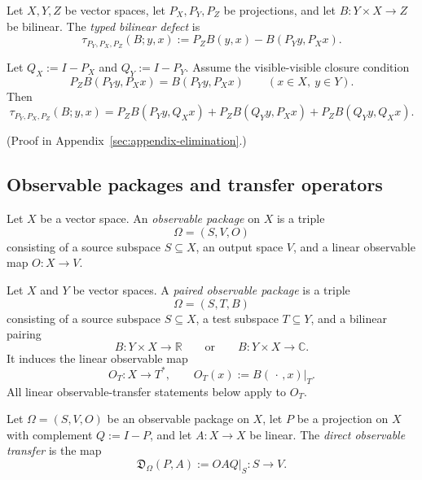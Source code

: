 \begin{definition}
\label{def:typed-bilinear-defect}
Let \(X,Y,Z\) be vector spaces, let \(P_X,P_Y,P_Z\) be projections, and let
\(B:Y\times X\to Z\) be bilinear. The \emph{typed bilinear defect} is
\[
\tau_{P_Y,P_X,P_Z}(B;y,x):=
P_ZB(y,x)-B(P_Yy,P_Xx).
\]
\end{definition}

\begin{proposition}
\label{prop:typed-bilinear-defect-decomposition}
Let \(Q_X:=I-P_X\) and \(Q_Y:=I-P_Y\). Assume the visible-visible closure
condition
\[
P_ZB(P_Yy,P_Xx)=B(P_Yy,P_Xx)
\qquad (x\in X,\ y\in Y).
\]
Then
\[
\tau_{P_Y,P_X,P_Z}(B;y,x)
=
P_ZB(P_Yy,Q_Xx)
+
P_ZB(Q_Yy,P_Xx)
+
P_ZB(Q_Yy,Q_Xx).
\]
\end{proposition}

(Proof in Appendix~\ref{sec:appendix-elimination}.)

\subsection{Observable packages and transfer operators}

\begin{definition}
\label{def:observable-package}
Let \(X\) be a vector space. An \emph{observable package} on \(X\) is a triple
\[
\Omega=(S,V,O)
\]
consisting of a source subspace \(S\subseteq X\), an output space \(V\), and a
linear observable map \(O:X\to V\).
\end{definition}

\begin{definition}
\label{def:paired-observable-package}
Let \(X\) and \(Y\) be vector spaces. A \emph{paired observable package} is a
triple
\[
\Omega=(S,T,B)
\]
consisting of a source subspace \(S\subseteq X\), a test subspace
\(T\subseteq Y\), and a bilinear pairing
\[
B:Y\times X\to \mathbb{R}
\qquad\text{or}\qquad
B:Y\times X\to \mathbb{C}.
\]
It induces the linear observable map
\[
O_T:X\to T^\ast,
\qquad
O_T(x):=B(\,\cdot\,,x)\big|_T.
\]
All linear observable-transfer statements below apply to \(O_T\).
\end{definition}

\begin{definition}
\label{def:direct-observable-transfer}
Let \(\Omega=(S,V,O)\) be an observable package on \(X\), let \(P\) be a
projection on \(X\) with complement \(Q:=I-P\), and let \(A:X\to X\) be
linear. The \emph{direct observable transfer} is the map
\[
\mathfrak D_{\Omega}(P,A):=
OAQ\big|_{S}:S\to V.
\]
\end{definition}

